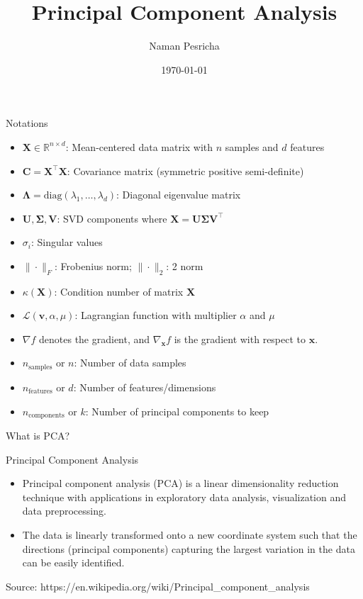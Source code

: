 \documentclass{beamer}
\title{Principal Component Analysis}
\author{Naman Pesricha}
\date{\today}
\begin{document}
\begin{frame}
    \titlepage
\end{frame}

\begin{frame}{Notations}
    \begin{itemize}
        \item $\mathbf{X} \in \mathbb{R}^{n \times d}$: Mean-centered data matrix with $n$ samples and $d$ features
        \item $\mathbf{ C} = \mathbf{X}^\top\mathbf{X}$: Covariance matrix (symmetric positive semi-definite)
        \item $\boldsymbol{\Lambda} = \text{diag}(\lambda_1, \ldots, \lambda_d)$: Diagonal eigenvalue matrix
        \item $\mathbf{U}, \mathbf{\Sigma}, \mathbf{V}$: SVD components where $\mathbf{X} = \mathbf{U}\mathbf{\Sigma}\mathbf{V}^\top$
        \item $\sigma_i$: Singular values 
        \item $\|\cdot\|_F$: Frobenius norm; $\|\cdot\|_2$: 2 norm
        \item $\kappa(\mathbf{X})$: Condition number of matrix $\mathbf{X}$
        \item $\mathcal{L}(\mathbf{v}, \alpha, \mu)$: Lagrangian function with multiplier $\alpha$ and $\mu$
        \item $\nabla f$ denotes the gradient, and $\nabla_{\mathbf{x}} f$ is the gradient with respect to $\mathbf{x}$.
        \item $n_{\text{samples}}$ or $n$: Number of data samples
        \item $n_{\text{features}}$ or $d$: Number of features/dimensions
        \item $n_{\text{components}}$ or $k$: Number of principal components to keep
    \end{itemize}
\end{frame}

\begin{frame}{What is PCA?}
    \begin{block}{Principal Component Analysis }
    \begin{itemize}
        \item Principal component analysis (PCA) is a linear dimensionality reduction technique with applications in exploratory data analysis, visualization and data preprocessing.
        
        \item The data is linearly transformed onto a new coordinate system such that the directions (principal components) capturing the largest variation in the data can be easily identified.
        
    \end{itemize}
        
    \end{block}

    
    \footnotesize{Source: \scriptsize{https://en.wikipedia.org/wiki/Principal\_component\_analysis}}
\end{frame}
\end{document}
